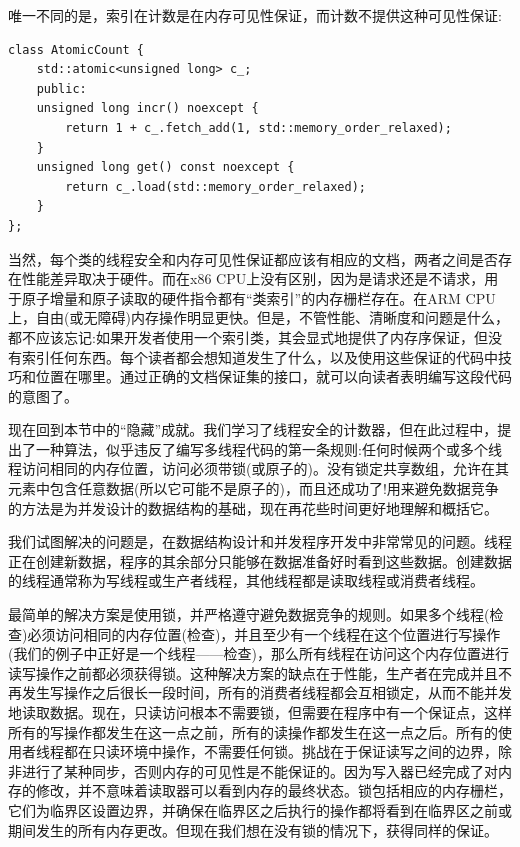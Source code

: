 唯一不同的是，索引在计数是在内存可见性保证，而计数不提供这种可见性保证:

\begin{lstlisting}[style=styleCXX]
class AtomicCount {
	std::atomic<unsigned long> c_;
	public:
	unsigned long incr() noexcept {
		return 1 + c_.fetch_add(1, std::memory_order_relaxed);
	}
	unsigned long get() const noexcept {
		return c_.load(std::memory_order_relaxed);
	}
};
\end{lstlisting}

当然，每个类的线程安全和内存可见性保证都应该有相应的文档，两者之间是否存在性能差异取决于硬件。而在x86 CPU上没有区别，因为是请求还是不请求，用于原子增量和原子读取的硬件指令都有“类索引”的内存栅栏存在。在ARM CPU上，自由(或无障碍)内存操作明显更快。但是，不管性能、清晰度和问题是什么，都不应该忘记:如果开发者使用一个索引类，其会显式地提供了内存序保证，但没有索引任何东西。每个读者都会想知道发生了什么，以及使用这些保证的代码中技巧和位置在哪里。通过正确的文档保证集的接口，就可以向读者表明编写这段代码的意图了。

现在回到本节中的“隐藏”成就。我们学习了线程安全的计数器，但在此过程中，提出了一种算法，似乎违反了编写多线程代码的第一条规则:任何时候两个或多个线程访问相同的内存位置，访问必须带锁(或原子的)。没有锁定共享数组，允许在其元素中包含任意数据(所以它可能不是原子的)，而且还成功了!用来避免数据竞争的方法是为并发设计的数据结构的基础，现在再花些时间更好地理解和概括它。


我们试图解决的问题是，在数据结构设计和并发程序开发中非常常见的问题。线程正在创建新数据，程序的其余部分只能够在数据准备好时看到这些数据。创建数据的线程通常称为写线程或生产者线程，其他线程都是读取线程或消费者线程。

最简单的解决方案是使用锁，并严格遵守避免数据竞争的规则。如果多个线程(检查)必须访问相同的内存位置(检查)，并且至少有一个线程在这个位置进行写操作(我们的例子中正好是一个线程——检查)，那么所有线程在访问这个内存位置进行读写操作之前都必须获得锁。这种解决方案的缺点在于性能，生产者在完成并且不再发生写操作之后很长一段时间，所有的消费者线程都会互相锁定，从而不能并发地读取数据。现在，只读访问根本不需要锁，但需要在程序中有一个保证点，这样所有的写操作都发生在这一点之前，所有的读操作都发生在这一点之后。所有的使用者线程都在只读环境中操作，不需要任何锁。挑战在于保证读写之间的边界，除非进行了某种同步，否则内存的可见性是不能保证的。因为写入器已经完成了对内存的修改，并不意味着读取器可以看到内存的最终状态。锁包括相应的内存栅栏，它们为临界区设置边界，并确保在临界区之后执行的操作都将看到在临界区之前或期间发生的所有内存更改。但现在我们想在没有锁的情况下，获得同样的保证。

